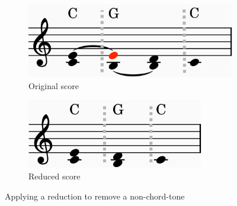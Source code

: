 \documentclass[12pt,a4paper,twoside,openright]{report}
\theoremstyle{definition}
\begin{document}
\begin{itemize}
\begin{figure}[h]
  \centering
  \begin{subfigure}[t]{.4\textwidth}
    \centering\includegraphics[keepaspectratio,width=\textwidth]{prep/harm/unreducedScore.png}
    \caption{Original score}
    \label{fig:pvHarmonyUnreducedInner}
  \end{subfigure}
  \begin{subfigure}[t]{.44\textwidth}
    \centering\includegraphics[keepaspectratio,width=0.85\textwidth]{prep/harm/reducedScore.png}
    \caption{Reduced score}
    \label{fig:pvHarmonyReducedInner}
  \end{subfigure}
  \captionsetup{width=.9\linewidth}
  \caption{Applying a reduction to remove a non-chord-tone}
  \label{fig:pvHarmony}
\end{figure}


\end{itemize}
\end{document}
